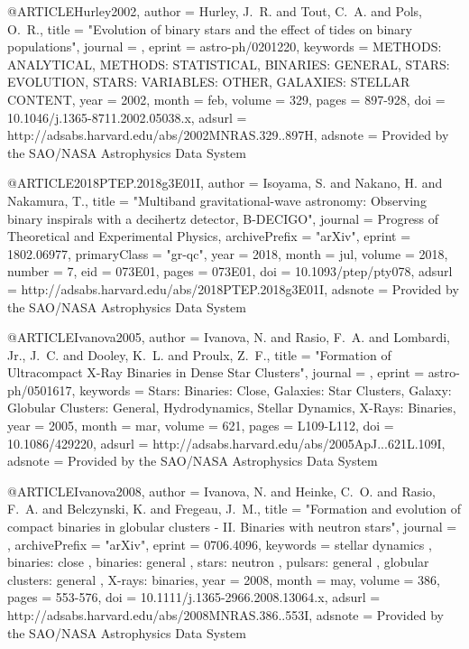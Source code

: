 \documentclass[twocolumn,tighten]{aastex63}
\begin{document}
{{{{{@ARTICLE{Hurley2002,
   author = {{Hurley}, J.~R. and {Tout}, C.~A. and {Pols}, O.~R.},
    title = "{Evolution of binary stars and the effect of tides on binary populations}",
  journal = {\mnras},
   eprint = {astro-ph/0201220},
 keywords = {METHODS: ANALYTICAL, METHODS: STATISTICAL, BINARIES: GENERAL, STARS: EVOLUTION, STARS: VARIABLES: OTHER, GALAXIES: STELLAR CONTENT},
     year = 2002,
    month = feb,
   volume = 329,
    pages = {897-928},
      doi = {10.1046/j.1365-8711.2002.05038.x},
   adsurl = {http://adsabs.harvard.edu/abs/2002MNRAS.329..897H},
  adsnote = {Provided by the SAO/NASA Astrophysics Data System}
}

@ARTICLE{2018PTEP.2018g3E01I,
   author = {{Isoyama}, S. and {Nakano}, H. and {Nakamura}, T.},
    title = "{Multiband gravitational-wave astronomy: Observing binary inspirals with a decihertz detector, B-DECIGO}",
  journal = {Progress of Theoretical and Experimental Physics},
archivePrefix = "arXiv",
   eprint = {1802.06977},
 primaryClass = "gr-qc",
     year = 2018,
    month = jul,
   volume = 2018,
   number = 7,
      eid = {073E01},
    pages = {073E01},
      doi = {10.1093/ptep/pty078},
   adsurl = {http://adsabs.harvard.edu/abs/2018PTEP.2018g3E01I},
  adsnote = {Provided by the SAO/NASA Astrophysics Data System}
}

@ARTICLE{Ivanova2005,
   author = {{Ivanova}, N. and {Rasio}, F.~A. and {Lombardi}, Jr., J.~C. and 
	{Dooley}, K.~L. and {Proulx}, Z.~F.},
    title = "{Formation of Ultracompact X-Ray Binaries in Dense Star Clusters}",
  journal = {\apjl},
   eprint = {astro-ph/0501617},
 keywords = {Stars: Binaries: Close, Galaxies: Star Clusters, Galaxy: Globular Clusters: General, Hydrodynamics, Stellar Dynamics, X-Rays: Binaries},
     year = 2005,
    month = mar,
   volume = 621,
    pages = {L109-L112},
      doi = {10.1086/429220},
   adsurl = {http://adsabs.harvard.edu/abs/2005ApJ...621L.109I},
  adsnote = {Provided by the SAO/NASA Astrophysics Data System}
}

@ARTICLE{Ivanova2008,
   author = {{Ivanova}, N. and {Heinke}, C.~O. and {Rasio}, F.~A. and {Belczynski}, K. and 
	{Fregeau}, J.~M.},
    title = "{Formation and evolution of compact binaries in globular clusters - II. Binaries with neutron stars}",
  journal = {\mnras},
archivePrefix = "arXiv",
   eprint = {0706.4096},
 keywords = {stellar dynamics , binaries: close , binaries: general , stars: neutron , pulsars: general , globular clusters: general , X-rays: binaries},
     year = 2008,
    month = may,
   volume = 386,
    pages = {553-576},
      doi = {10.1111/j.1365-2966.2008.13064.x},
   adsurl = {http://adsabs.harvard.edu/abs/2008MNRAS.386..553I},
  adsnote = {Provided by the SAO/NASA Astrophysics Data System}
}

}}}}}
\end{document}
